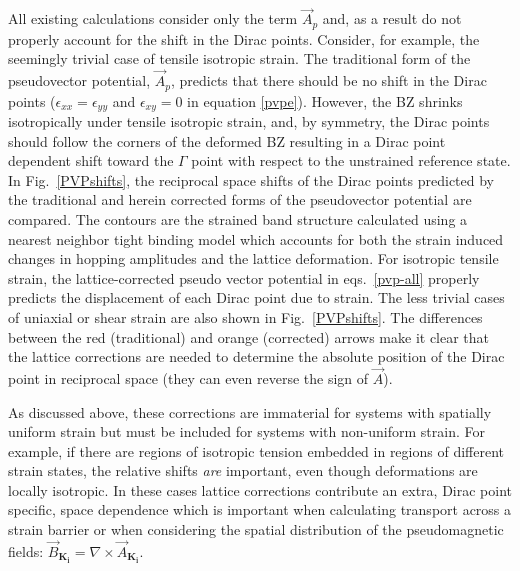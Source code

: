 All existing calculations consider only the term $\vec{A}_p$ and, as a result do not properly account for the shift in the Dirac points.
Consider, for example, the seemingly trivial case of tensile isotropic strain.
The traditional form of the pseudovector potential, $\vec{A}_p$, predicts that there should be no shift in the Dirac points ($\epsilon_{xx}=\epsilon_{yy}$ and $\epsilon_{xy}=0$ in equation \ref{pvpe}).
However, the BZ shrinks isotropically under tensile isotropic strain, and, by symmetry, the Dirac points should follow the corners of the deformed BZ resulting in a Dirac point dependent shift toward the $\Gamma$ point with respect to the unstrained reference state.
In Fig.~\ref{PVPshifts}, the reciprocal space shifts of the Dirac points predicted by the traditional and herein corrected forms of the pseudovector potential are compared.
The contours are the strained band structure calculated using a nearest neighbor tight binding model which accounts for both the strain induced changes in hopping amplitudes and the lattice deformation\cite{Pereira2009}.
For isotropic tensile strain, the lattice-corrected pseudo vector potential in eqs.~\eqref{pvp-all} properly predicts the displacement of each Dirac point due to strain.
The less trivial cases of uniaxial or shear strain are also shown in Fig.~\ref{PVPshifts}. The differences between the red (traditional) and orange (corrected) arrows make it clear that the lattice corrections are needed to determine the absolute position of the Dirac point in reciprocal space (they can even reverse the sign of $\vec{A}$).

As discussed above, these corrections are immaterial for systems with spatially uniform strain but must be included for systems with non-uniform strain.
For example, if there are regions of isotropic tension embedded in regions of different strain states, the relative shifts \emph{are} important, even though deformations are locally isotropic.
In these cases lattice corrections contribute an extra, Dirac point specific, space dependence which is important when calculating transport across a strain barrier or when considering the spatial distribution of the pseudomagnetic fields: $\vec{B}_{\bm{K_i}} = \nabla \times \vec{A}_{\bm{K_i}}$.

